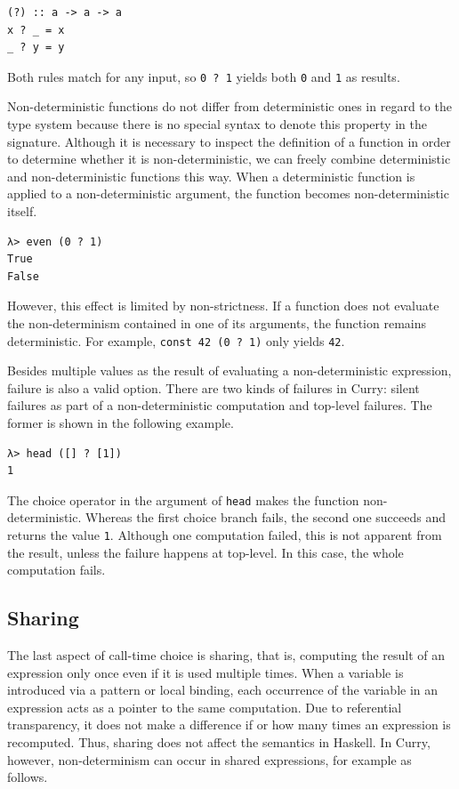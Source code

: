 \documentclass[a4paper, 11pt, fleqn, twoside, abstract=on]{scrreprt}
\newcommand{\hinl}[1]{\texttt{#1}}
\begin{document}
\begin{verbatim}
(?) :: a -> a -> a
x ? _ = x
_ ? y = y
\end{verbatim}
\noindent
Both rules match for any input, so \hinl{0 ? 1} yields both \hinl{0} and \hinl{1} as results.

Non-deterministic functions do not differ from deterministic ones in regard to the type system because there is no special syntax to denote this property in the signature.
Although it is necessary to inspect the definition of a function in order to determine whether it is non-deterministic, we can freely combine deterministic and non-deterministic functions this way.
When a deterministic function is applied to a non-deterministic argument, the function becomes non-deterministic itself.

\begin{verbatim}
λ> even (0 ? 1)
True
False
\end{verbatim}

However, this effect is limited by non-strictness.
If a function does not evaluate the non-determinism contained in one of its arguments, the function remains deterministic.
For example, \hinl{const 42 (0 ? 1)} only yields \hinl{42}.

Besides multiple values as the result of evaluating a non-deterministic expression, failure is also a valid option.
There are two kinds of failures in Curry: silent failures as part of a non-deterministic computation and top-level failures.
The former is shown in the following example.

\begin{verbatim}
λ> head ([] ? [1])
1
\end{verbatim}

The choice operator in the argument of \hinl{head} makes the function non-deterministic.
Whereas the first choice branch fails, the second one succeeds and returns the value \hinl{1}.
Although one computation failed, this is not apparent from the result, unless the failure happens at top-level.
In this case, the whole computation fails.

\subsection{Sharing}
The last aspect of call-time choice is sharing, that is, computing the result of an expression only once even if it is used multiple times.
When a variable is introduced via a pattern or local binding, each occurrence of the variable in an expression acts as a pointer to the same computation.
Due to referential transparency, it does not make a difference if or how many times an expression is recomputed.
Thus, sharing does not affect the semantics in Haskell.
In Curry, however, non-determinism can occur in shared expressions, for example as follows.
\end{document}
